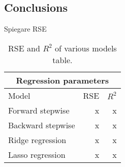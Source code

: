 \subsection{Conclusions}

Spiegare RSE

\begin{table}[H]
	\centering
	\begin{tabular}{|| l | r | r ||} 
		\hline
		\multicolumn{3}{|c|}{Regression parameters} \\
		\hline
		Model & RSE & $R^2$ \\
		\hline
		Forward stepwise & x & x \\
		\hline
		Backward stepwise & x & x \\
		\hline
		Ridge regression & x & x \\
		\hline
		Lasso regression & x & x \\
		\hline
	\end{tabular}
	\caption{RSE and $R^2$ of various models table.}
	\label{table:RegEvalParams}
\end{table}